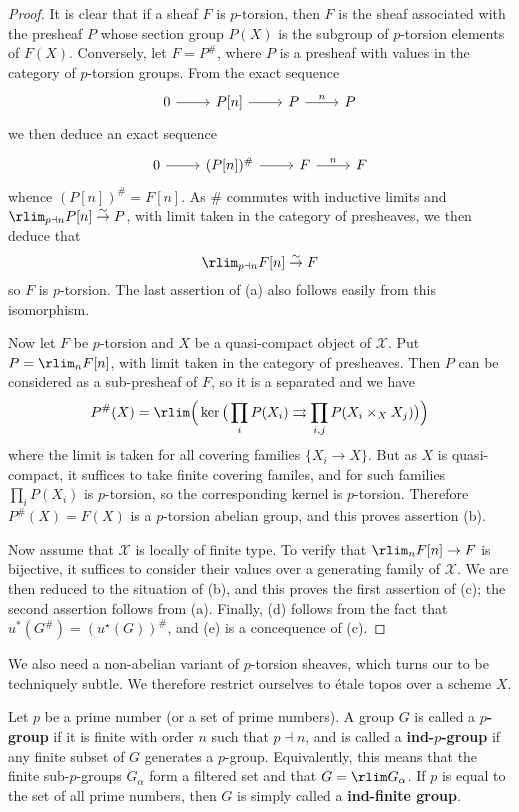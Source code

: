 \begin{proof}
It is clear that if a sheaf $F$ is $p$-torsion, then $F$ is the sheaf associated with the presheaf $P$ whose section group $P(X)$ is the subgroup of $p$-torsion elements of $F(X)$. Conversely, let $F=P^\#$, where $P$ is a presheaf with values in the category of $p$-torsion groups. From the exact sequence
\[\begin{tikzcd}
0\ar[r]&P[n]\ar[r]&P\ar[r,"n"]&P
\end{tikzcd}\]
we then deduce an exact sequence
\[\begin{tikzcd}
0\ar[r]&(P[n])^\#\ar[r]&F\ar[r,"n"]&F
\end{tikzcd}\]
whence $(P[n])^\#=F[n]$. As $\#$ commutes with inductive limits and $\rlim_{p\dashv n}P[n]\stackrel{\sim}{\to}P$, with limit taken in the category of presheaves, we then deduce that
\[\rlim_{p\dashv n}F[n]\stackrel{\sim}{\to} F\]
so $F$ is $p$-torsion. The last assertion of (a) also follows easily from this isomorphism.\par
Now let $F$ be $p$-torsion and $X$ be a quasi-compact object of $\mathcal{X}$. Put $P=\rlim_nF[n]$, with limit taken in the category of presheaves. Then $P$ can be considered as a sub-presheaf of $F$, so it is a separated and we have
\[P^\#(X)=\rlim\Big(\ker\big(\prod_iP(X_i)\rightrightarrows \prod_{i,j}P(X_i\times_XX_j)\big)\Big)\]
where the limit is taken for all covering families $\{X_i\to X\}$. But as $X$ is quasi-compact, it suffices to take finite covering familes, and for such families $\prod_iP(X_i)$ is $p$-torsion, so the corresponding kernel is $p$-torsion. Therefore $P^\#(X)=F(X)$ is a $p$-torsion abelian group, and this proves assertion (b).\par
Now assume that $\mathcal{X}$ is locally of finite type. To verify that $\rlim_nF[n]\to F$ is bijective, it suffices to consider their values over a generating family of $\mathcal{X}$. We are then reduced to the situation of (b), and this proves the first assertion of (c); the second assertion follows from (a). Finally, (d) follows from the fact that $u^*(G^\#)=(u^\star(G))^\#$, and (e) is a concequence of (c).
\end{proof}

We also need a non-abelian variant of $p$-torsion sheaves, which turns our to be techniquely subtle. We therefore restrict ourselves to \'etale topos over a scheme $X$.

\begin{definition}
Let $p$ be a prime number (or a set of prime numbers). A group $G$ is called a \textbf{$p$-group} if it is finite with order $n$ such that $p\dashv n$, and is called a \textbf{ind-$p$-group} if any finite subset of $G$ generates a $p$-group. Equivalently, this means that the finite sub-$p$-groups $G_\alpha$ form a filtered set and that $G=\rlim G_\alpha$. If $p$ is equal to the set of all prime numbers, then $G$ is simply called a \textbf{ind-finite group}.
\end{definition}


